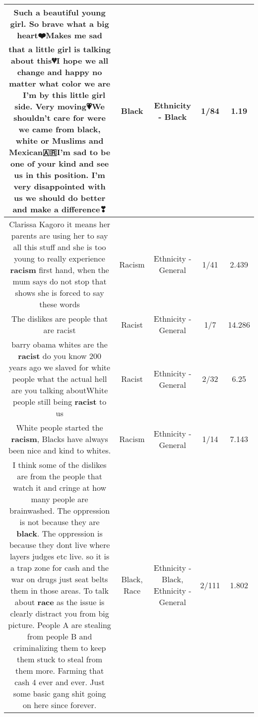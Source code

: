 \documentclass[11pt]{article}
\newlength\mylength
\begin{document}
\begin{center}
\begin{longtable}{|C{.65\mylength}|C{.30\mylength}|C{.12\mylength}|C{.12\mylength}|C{.12\mylength}|}
  \small Such a beautiful young girl. So brave what a big heart❤️Makes me sad that a little girl is talking about this💔I hope we all change and happy no matter what color we are👩🏻👩🏿I'm by this little girl side. Very moving💗We shouldn't care for were we came from \textbf{black}, white or Muslims and Mexican🇦🇷I'm sad to be one of your kind and see us in this position. I'm very disappointed with us we should do better and make a difference❣\normalsize   & Black & Ethnicity - Black & 1/84 & 1.19 \\  \hline
  \small Clarissa Kagoro it means her parents are using her to say all this stuff and she is too young to really experience \textbf{racism} first hand, when the mum says do not stop that shows she is forced to say these words\normalsize   & Racism & Ethnicity - General & 1/41 & 2.439 \\  \hline
  \small The dislikes are people that are racist\normalsize   & Racist & Ethnicity - General & 1/7 & 14.286 \\  \hline
  \small barry obama whites are the \textbf{racist} do you know 200 years ago we slaved for white people what the actual hell are you talking aboutWhite people still being \textbf{racist} to us\normalsize   & Racist & Ethnicity - General & 2/32 & 6.25 \\  \hline
  \small White people started the \textbf{racism}, Blacks have always been nice and kind to whites.\normalsize   & Racism & Ethnicity - General & 1/14 & 7.143 \\  \hline
  \small I think some of the dislikes are from the people that watch it and cringe at how many people are brainwashed. The oppression is not because they are \textbf{black}. The oppression is because they dont live where layers judges etc live. so it is a trap zone for cash and the war on drugs just seat belts them in those areas. To talk about \textbf{race} as the issue is clearly distract you from big picture. People A are stealing from people B and criminalizing them to keep them stuck to steal from them more. Farming that cash 4 ever and ever. Just some basic gang shit going on here since forever.\normalsize   & Black, Race & Ethnicity - Black, Ethnicity - General & 2/111 & 1.802 \\  \hline

\end{longtable}
\end{center}
\end{document}
